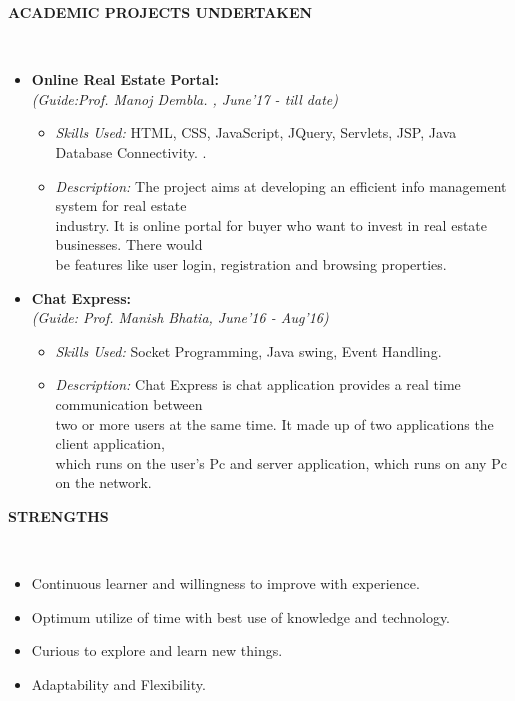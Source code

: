 \documentclass[a4paper,10pt]{article}
\newcommand{\isep}{-2 pt}
\newcommand{\lsep}{-0.5cm}
\newcommand{\resheading}[1]{{\small \colorbox{mygrey}{\begin{minipage}{0.975\textwidth}{\textbf{#1 \vphantom{p\^{E}}}}\end{minipage}}}}
\begin{document}
\resheading{\textbf{ACADEMIC PROJECTS UNDERTAKEN } }\\[\lsep]
\begin{itemize}
\item \textbf{Online Real Estate Portal: } \\
 \emph{(Guide:Prof. Manoj Dembla.
, June'17 - till date)} \\[-0.6cm]
	\begin{itemize}\itemsep \isep
	\item \textit{Skills Used:} HTML, CSS, JavaScript, JQuery, Servlets, JSP, Java Database Connectivity.
.
	\item \textit{Description:} The project aims at developing an efficient info management system for real estate \\
	industry. It is online portal for buyer who want to invest in real estate businesses. There would
	\\ 
	be features like user login, registration and browsing properties.

	\end{itemize}

\item \textbf{Chat Express:}\\
 \emph{(Guide: Prof. Manish Bhatia, June'16 - Aug'16)} \\[-0.6cm]
	\begin{itemize}\itemsep \isep
	\item \textit{Skills Used:} Socket Programming, Java swing, Event Handling.
	\item \textit{Description:} Chat Express is chat application provides a real time communication between\\
	two or more users at the same time. It made up of two applications the client application,\\ 
	which runs on the user’s Pc and server application, which runs on any Pc on the network. 
	\end{itemize}
\end{itemize}

\resheading{\textbf{STRENGTHS} }\\[\lsep]
\begin{itemize}
\item \noindent	Continuous learner and willingness to improve with experience.
\item \noindent	Optimum utilize of time with best use of knowledge and technology.
\item \noindent	Curious to explore and learn new things.
\item \noindent Adaptability and Flexibility.
\end{itemize}
\end{document}
